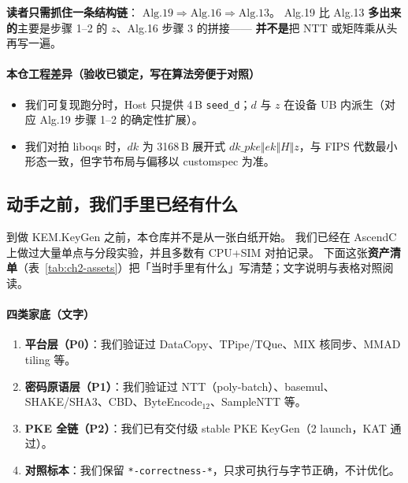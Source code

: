 \documentclass[UTF8,a4paper,11pt]{ctexart}
\theoremstyle{definition}
\theoremstyle{plain}
\theoremstyle{remark}
\numberwithin{figure}{section}
\numberwithin{table}{section}
\begin{document}
\textbf{读者只需抓住一条结构链}：
$\text{Alg.19} \Rightarrow \text{Alg.16} \Rightarrow \text{Alg.13}$。
Alg.19 比 Alg.13 \textbf{多出来的}主要是步骤 1--2 的 $z$、Alg.16 步骤 3 的拼接——
\textbf{并不是}把 NTT 或矩阵乘从头再写一遍。

\paragraph{本仓工程差异（验收已锁定，写在算法旁便于对照）}
\begin{itemize}
  \item 我们可复现跑分时，Host 只提供 4\,B \texttt{seed\_d}；$d$ 与 $z$ 在设备 UB 内派生（对应 Alg.19 步骤 1--2 的确定性扩展）。
  \item 我们对拍 liboqs 时，$\mathit{dk}$ 为 3168\,B 展开式
        $\mathit{dk\_pke}\Vert\mathit{ek}\Vert H\Vert z$，与 FIPS 代数最小形态一致，但字节布局与偏移以 customspec 为准。
\end{itemize}

\subsection{动手之前，我们手里已经有什么}

到做 KEM.KeyGen 之前，本仓库并不是从一张白纸开始。
我们已经在 AscendC 上做过大量单点与分段实验，并且多数有 CPU+SIM 对拍记录。
下面这张\textbf{资产清单}（表~\ref{tab:ch2-assets}）把「当时手里有什么」写清楚；文字说明与表格对照阅读。

\paragraph{四类家底（文字）}
\begin{enumerate}
  \item \textbf{平台层（P0）}：我们验证过 DataCopy、TPipe/TQue、MIX 核同步、MMAD tiling 等。
  \item \textbf{密码原语层（P1）}：我们验证过 NTT（poly-batch）、basemul、SHAKE/SHA3、CBD、ByteEncode$_{12}$、SampleNTT 等。
  \item \textbf{PKE 全链（P2）}：我们已有交付级 stable PKE KeyGen（2 launch，KAT 通过）。
  \item \textbf{对照标本}：我们保留 \texttt{*-correctness-*}，只求可执行与字节正确，不计优化。
\end{enumerate}
\end{document}
